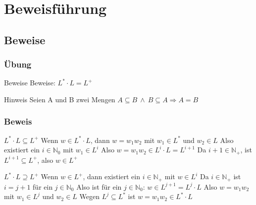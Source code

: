 \documentclass{beamer}
\begin{document}
\section{Beweisführung}
\subsection{Beweise}
\begin{frame}
	\frametitle{Übung}
	\begin{block}{Beweise}
		Beweise: $L^{*} \cdot L = L^{+}$
	\end{block}
	\begin{block}{Hinweis}
		Seien A und B zwei Mengen
		\newline $A \subseteq B \ \land \ B \subseteq A \Rightarrow A = B$
	\end{block}
\end{frame}

\begin{frame}
	\frametitle{Beweis}
	\begin{block}{$L^{*} \cdot L \subseteq L^{+}$}
		Wenn $w \in L^{*} \cdot L$, dann $w = w_{1}w_{2}$ mit $w_{1} \in L^{*}$ und
$w_{2} \in L$ \newline
		Also existiert ein $i \in \mathbb N_{0}$ mit $w_{1} \in L^{i}$ \newline
Also $w = w_{1}w_{2} \in L^{i} \cdot L = L^{i+1}$ \newline
Da $i+1 \in \mathbb N_{+}$, ist $L^{i+1} \subseteq L^{+}$, also $w \in L^{+}$
	\end{block}
	\begin{block}{$L^{*} \cdot L \supseteq L^{+}$}
		Wenn $w \in L^{+}$, dann existiert ein $i \in \mathbb N_{+}$ mit $w \in L^{i}$
\newline 
		Da $i \in \mathbb N_{+}$ ist $i = j + 1$ für ein $j \in \mathbb N_{0}$
\newline 
		Also ist für ein $j \in \mathbb N_{0}$: $w \in L^{j+1} = L^{j} \cdot L$
\newline 
		Also $w = w_{1}w_{2}$ mit $w_{1} \in L^{j}$ und $w_{2} \in L$ \newline
Wegen $L^{j} \subseteq L^{*}$ ist $w = w_{1}w_{2} \in L^{*} \cdot L$
	\end{block}
\end{frame}
\end{document}
